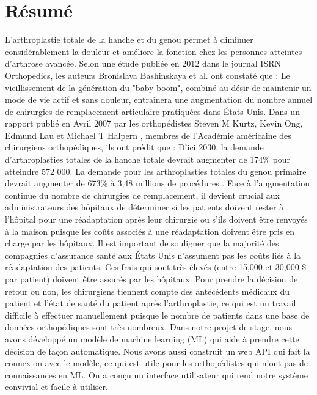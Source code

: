 \documentclass[12pt, french]{report}
\begin{document}
\chapter*{Résumé}
L'arthroplastie totale de la hanche et du genou permet à diminuer considérablement la douleur
et améliore la fonction chez les personnes atteintes d'arthrose avancée. Selon une étude publiée en 2012 dans le journal ISRN Orthopedics, les auteurs Bronislava Bashinskaya et al. \cite{key2} ont constaté que : \guillemotleft Le
vieillissement de la génération du "baby boom", combiné au désir de
maintenir un mode de vie actif et sans douleur, entraînera une augmentation
du nombre annuel de chirurgies de remplacement articulaire pratiquées dans
États Unis\guillemotright. Dans un rapport publié en Avril 2007 par les orthopédistes Steven M Kurtz, Kevin Ong, Edmund Lau et Michael T Halpern \cite{key3}, membres de l'Académie américaine des chirurgiens orthopédiques, ils ont prédit que : \guillemotleft  
D'ici 2030, la demande d'arthroplasties totales de la hanche totale devrait augmenter de 174\% pour atteindre 572 000. La demande pour les arthroplasties totales du genou primaire devrait augmenter de 673\% à 3,48 millions de procédures
 \guillemotright.
Face à l'augmentation continue du nombre de chirurgies de remplacement, il devient crucial aux administrateurs des hôpitaux de déterminer si les patients doivent rester à l'hôpital pour une réadaptation après leur 	chirurgie ou s'ils doivent être renvoyés à la maison puisque les coûts associés à une réadaptation doivent être pris en charge par les hôpitaux. Il est important de souligner que la majorité des compagnies d'assurance santé aux États Unis n'assument pas les coûts liés à la réadaptation des patients. Ces frais qui sont très élevés (entre 15,000 et 30,000 \$ par patient) doivent être assurés par les hôpitaux. Pour prendre la décision de retour ou non, les chirurgiens tiennent compte des antécédents médicaux du patient et l'état de santé du patient après l'arthroplastie, ce qui est un travail difficile à effectuer manuellement puisque le nombre de patients dans une base de données orthopédiques sont très nombreux. Dans notre projet de stage, nous avons développé un modèle de machine learning (ML) qui aide à prendre cette décision de façon automatique. Nous avons aussi construit un web API qui fait la connexion avec le modèle, ce qui est utile pour les orthopédistes qui n'ont pas de connaissances en ML. On a conçu un interface utilisateur qui rend notre système convivial et facile à utiliser. 
   	
\end{document}

